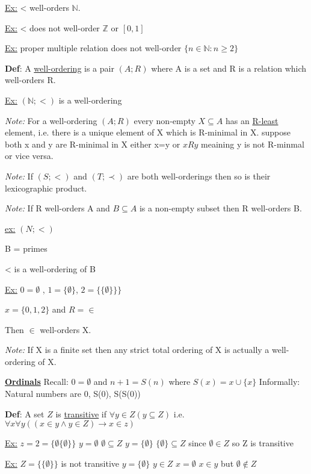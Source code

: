 \documentclass{article}
\begin{document}
    \underline{Ex:} < well-orders $\mathbb{N}$.

    \underline{Ex:} < does not well-order $\mathbb{Z}$ or $[0,1]$

    \underline{Ex:} proper multiple relation does not well-order $\{n \in \mathbb{N} : n \geq 2\}$

    \textbf{Def}: A \underline{well-ordering} is a pair $(A ; R)$ where A is a set and R is a relation which well-orders R.

    \underline{Ex:} $(\mathbb{N};<)$ is a well-ordering

    \emph{Note:} For a well-ordering $(A;R)$ every non-empty $X \subseteq A $ has an \underline{R-least} element, i.e. there is a unique element of X which is R-minimal in X.
    suppose both x and y are R-minimal in X
    either x=y or $x R y$ meaining y is not R-minmal or vice versa.

    \emph{Note:} If $(S;<)$ and $(T;\prec)$ are both well-orderings then so is their lexicographic product.

    \emph{Note:} If R well-orders A and $B \subseteq A$ is a non-empty subset then R well-orders B.

    \underline{ex:} $(N;<)$

    B = primes

    < is a well-ordering of B
    
    \underline{Ex:} $0=\emptyset$ , $1 = \{\emptyset\}$, $2 = \{\{\emptyset\}\}\}$
    
    $x = \{0,1,2\}$ and $R = \in$
    
    Then $\in$ well-orders X.
    
    \emph{Note:} If X is a finite set then any strict total ordering of X is actually a well-ordering of X.
    
    
    \textbf{\underline{Ordinals}}
    Recall: $0=\emptyset$ and $n+1=S(n)$ where $S(x) = x \cup \{x\}$
    Informally: Natural numbers are 0, S(0), S(S(0))
    
    \textbf{Def}: A set $Z$ is \underline{transitive} if $\forall y \in Z (y \subseteq Z)$
    i.e. $\forall x \forall y ((x \in y \wedge y \in Z) \rightarrow x \in z)$
    
    \underline{Ex:} $z=2=\{\emptyset\{\emptyset\}\}$
    $y=\emptyset$
    $\emptyset \subseteq Z$
    $y=\{\emptyset\}$
    $\{\emptyset\} \subseteq Z$ since $\emptyset \in Z$
    so Z is transitive
    
    \underline{Ex:} $Z=\{\{\emptyset\}\}$ is not transitive
    $y=\{\emptyset\}$
    $y \in Z$
    $x=\emptyset$
    $x \in y$
    but $\emptyset \notin Z$
    
\end{document}
